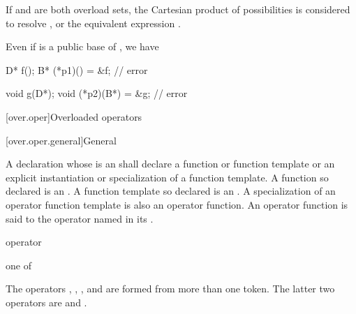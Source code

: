 \pnum
\begin{note}
If  and  are both overload sets,
the Cartesian product of possibilities is considered
to resolve , or the equivalent expression .
\end{note}

\pnum
{}%
\begin{note}
Even if  is a public base of ,
we have
\begin{codeblock}
D* f();
B* (*p1)() = &f;                // error

void g(D*);
void (*p2)(B*) = &g;            // error
\end{codeblock}
\end{note}

[over.oper]{Overloaded operators}%

[over.oper.general]{General}%
%
%

\pnum
{}%
A declaration
whose  is an 
shall declare a function or function template or
an explicit instantiation or specialization of a function template.
A function so declared is an .
A function template so declared is
an .
A specialization of an operator function template is also an operator function.
An operator function is said to
the operator named in its
.

\begin{bnf}
\br
     operator
\end{bnf}

\begin{bnf}
\obeyspaces
{} \textnormal{one of}\br
    \br
    \terminal{\~        !        +        -        *        /        \%        \caret{}        \&}\br
    \terminal{|        =        +=       -=       *=       /=       \%=       \caret{}=       \&=}\br
    \terminal{|=       ==       !=       <        >        <=       >=       <=>      \&\&}\br
    \terminal{||       <<       >>       <<=      >>=      ++       --       ,}\br
\end{bnf}
\begin{note}
The operators
,
,
\tcode{()},
and
\tcode{[]}
are formed from more than one token.
The latter two operators are 
and .
\end{note}
%
%

